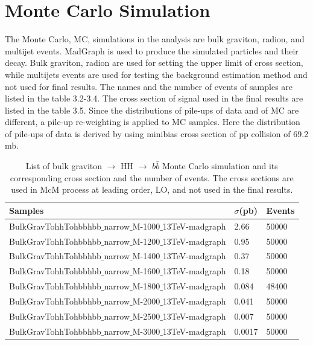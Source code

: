 \section{Monte Carlo Simulation} \label{Monte Carlo Simulation}	
The Monte Carlo, MC, simulations in the analysis are bulk graviton, radion, and multijet events. MadGraph is used to produce the simulated particles and their decay\citep{Alwall2011}. Bulk graviton, radion are used for setting the upper limit of cross section, while multijets events are used for testing the background estimation method and not used for final results. The names and the number of events of samples are listed in the table 3.2-3.4. The cross section of signal used in the final results are listed in the table 3.5\citep{WED_BG_13TeV,WED_radion_13TeV,WED_BGHHDecay_13TeV,WED_radionHHDecay_13TeV}. Since the distributions of pile-ups of data and of MC are different, a pile-up re-weighting is applied to MC samples. Here the distribution of pile-ups of data is derived by using minibias cross section of pp collision of 69.2 mb\citep{Aaboud:2016mmw}.%
\begin{table}[h!]
  \begin{center}
    \begin{tabular}{l|l|l}
    Samples & $\sigma$(pb) & Events \\
    \hline
    BulkGravTohhTohbbhbb$\_$narrow$\_$M-1000$\_$13TeV-madgraph & 2.66 & 50000 \\
    BulkGravTohhTohbbhbb$\_$narrow$\_$M-1200$\_$13TeV-madgraph & 0.95 & 50000 \\
    BulkGravTohhTohbbhbb$\_$narrow$\_$M-1400$\_$13TeV-madgraph & 0.37 & 50000 \\
    BulkGravTohhTohbbhbb$\_$narrow$\_$M-1600$\_$13TeV-madgraph & 0.18 & 50000 \\
    BulkGravTohhTohbbhbb$\_$narrow$\_$M-1800$\_$13TeV-madgraph & 0.084 & 48400 \\
    BulkGravTohhTohbbhbb$\_$narrow$\_$M-2000$\_$13TeV-madgraph & 0.041 & 50000 \\
    BulkGravTohhTohbbhbb$\_$narrow$\_$M-2500$\_$13TeV-madgraph & 0.007 & 50000 \\
    BulkGravTohhTohbbhbb$\_$narrow$\_$M-3000$\_$13TeV-madgraph & 0.0017 & 50000 \\
    	\hline
    \end{tabular}
  \end{center}

  \caption{List of bulk graviton $\rightarrow$ HH $\rightarrow$ $b\bar{b}$ Monte Carlo simulation and its corresponding cross section and the number of events. The cross sections are used in McM process at leading order, LO, and not used in the final results.}
\end{table} 

